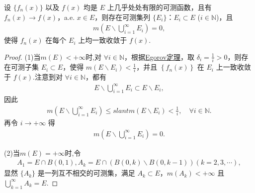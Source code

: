 \documentclass[../../main.tex]{subfiles}
\begin{document}
\begin{corollary}
设 $\{f_n(x)\}$ 以及 $f(x)$ 均是 $E$ 上几乎处处有限的可测函数，且有 $f_n(x)\to f(x)$，a.e. $x\in E$，则存在可测集列 $\{E_i\}$：$E_i\subset E$ ($i\in\mathbb{N}$)，且
\begin{align*}
m\left(E\backslash\bigcup_{i = 1}^{\infty}E_i\right)=0,
\end{align*}
使得 $f_n(x)$ 在每个 $E_i$ 上均一致收敛于 $f(x)$. 
\end{corollary}
\begin{proof}
(1)当$m(E)<+\infty$时,对 $\forall i\in \mathbb{N}$，根据\hyperref[theorem:Egorov定理]{Egorov定理}，取 $\delta _i=\frac{1}{i}>0$，则存在可测子集 $E_i\subset E$，使得 $m\left( E\backslash E_i \right) <\frac{1}{i}$，并且 $\left\{ f_n\left( x \right) \right\}$ 在 $E_i$ 上一致收敛于 $f\left( x \right)$.注意到对 $\forall i\in \mathbb{N}$，都有
\begin{align*}
E\backslash \bigcup_{i=1}^{\infty}{E_i}\subset E\backslash E_i,
\end{align*}
因此
\begin{align*}
m\left( E\backslash \bigcup_{i=1}^{\infty}{E_i} \right) \leqslant slant m\left( E\backslash E_i \right) <\frac{1}{i},\quad \forall i\in \mathbb{N}.
\end{align*}
再令 $i\rightarrow +\infty$ 得
\begin{align*}
m\left( E\backslash \bigcup_{i=1}^{\infty}{E_i} \right) =0.
\end{align*}

(2)当$m(E)=+\infty$时,令
\begin{align*}
A_1=E\cap B(0,1),
A_k=E\cap (B(0,k)\backslash B(0,k - 1))(k = 2,3,\cdots),
\end{align*}
显然 $\{A_k\}$ 是一列互不相交的可测集，满足 $A_k\subset E$，$m(A_k)<+\infty$ 且 $\bigcup_{k = 1}^{\infty}A_k=E$.


\end{proof}
\end{document}
